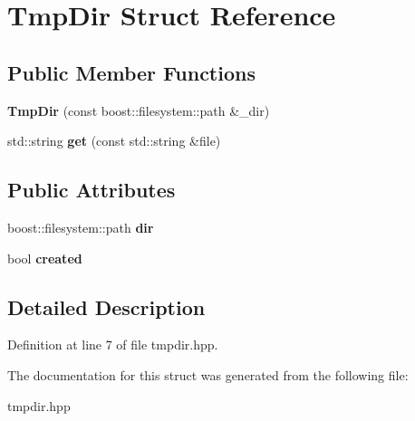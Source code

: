 \hypertarget{struct_tmp_dir}{\section{Tmp\-Dir Struct Reference}
\label{struct_tmp_dir}
}
\subsection*{Public Member Functions}
\begin{DoxyCompactItemize}
\item 
\hypertarget{struct_tmp_dir_ab6eb3c14ad940888b62323724d288b0e}{{\bfseries Tmp\-Dir} (const boost\-::filesystem\-::path \&\-\_\-dir)}\label{struct_tmp_dir_ab6eb3c14ad940888b62323724d288b0e}

\item 
\hypertarget{struct_tmp_dir_a676580b8e88aa59aecf47e4dbf60c046}{std\-::string {\bfseries get} (const std\-::string \&file)}\label{struct_tmp_dir_a676580b8e88aa59aecf47e4dbf60c046}

\end{DoxyCompactItemize}
\subsection*{Public Attributes}
\begin{DoxyCompactItemize}
\item 
\hypertarget{struct_tmp_dir_a08da41cc77d03afe359b7deb49229105}{boost\-::filesystem\-::path {\bfseries dir}}\label{struct_tmp_dir_a08da41cc77d03afe359b7deb49229105}

\item 
\hypertarget{struct_tmp_dir_ab485557a85cf415394ddbcae7d0fe4f7}{bool {\bfseries created}}\label{struct_tmp_dir_ab485557a85cf415394ddbcae7d0fe4f7}

\end{DoxyCompactItemize}


\subsection{Detailed Description}


Definition at line 7 of file tmpdir.\-hpp.



The documentation for this struct was generated from the following file\-:\begin{DoxyCompactItemize}
\item 
tmpdir.\-hpp\end{DoxyCompactItemize}
